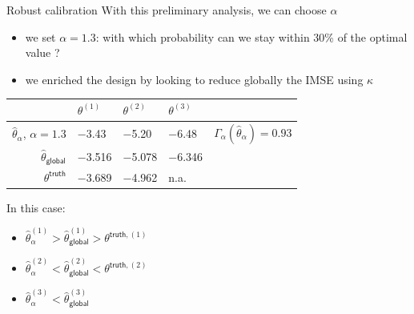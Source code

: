 \documentclass[10pt,aspectratio=169,usepdftitle=false]{beamer}
\newcommand{\kk}{\theta}
\begin{document}
\begin{frame}{Robust calibration}
  With this preliminary analysis, we can choose $\alpha$
  \begin{itemize}
  \item we set $\alpha=1.3$: with which probability can we stay within 30\% of the optimal value ?
  \item we enriched the design by looking to reduce globally the IMSE using $\kappa$
  \end{itemize}
  \begin{center}
    \begin{tabular}{rllll}
      \toprule
       & $\kk^{(1)}$ &$\kk^{(2)}$ & $\kk^{(3)}$ & \\ \midrule
     $\hat{\kk}_{\alpha}$, $\alpha=1.3$ & \num{-3.43} & \num{-5.20} &\num{-6.48}&$\Gamma_{\alpha}(\hat{\kk}_{\alpha})=\num{0.93}$  \\
    $\hat{\kk}_{\mathsf{global}}$ & \num{-3.516} & \num{-5.078} & \num{-6.346} &\\
      ${\kk}^{\mathsf{truth}}$ & \num{-3.689} & \num{-4.962}& {n.a.} &\\
    \bottomrule
  \end{tabular}
\end{center}
  In this case:
\begin{itemize}
\item $\hat{\kk}_{\alpha}^{(1)}> \hat{\kk}_{\mathsf{global}}^{(1)} > \kk^{\mathsf{truth}, (1)}$
\item $\hat{\kk}_{\alpha}^{(2)} < \hat{\kk}_{\mathsf{global}}^{(2)} < \kk^{\mathsf{truth}, (2)}$
\item $\hat{\kk}^{(3)}_{\alpha}< \hat{\kk}_{\mathsf{global}}^{(3)}$
\end{itemize}
\end{frame}
\end{document}
